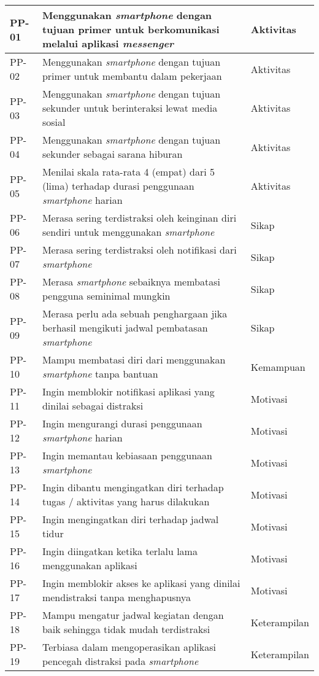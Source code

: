 \begin{footnotesize}
\begin{longtable}[c]{|W{c}{0.07\textwidth}|>{\ccnormspacing}m{0.66\textwidth}|>{\ccnormspacingcenter}m{0.165\textwidth}|}
  PP-01  &  Menggunakan \textit{smartphone} dengan tujuan primer untuk berkomunikasi melalui aplikasi \textit{messenger}  & Aktivitas \\ \hline
  PP-02  &  Menggunakan \textit{smartphone} dengan tujuan primer untuk membantu dalam pekerjaan & Aktivitas \\ \hline
  PP-03  &  Menggunakan \textit{smartphone} dengan tujuan sekunder untuk berinteraksi lewat media sosial & Aktivitas \\ \hline
  PP-04  &  Menggunakan \textit{smartphone} dengan tujuan sekunder sebagai sarana hiburan & Aktivitas \\ \hline
  PP-05  &  Menilai skala rata-rata 4 (empat) dari 5 (lima) terhadap durasi penggunaan \textit{smartphone} harian & Aktivitas \\ \hline
  PP-06  &  Merasa sering terdistraksi oleh keinginan diri sendiri untuk menggunakan \textit{smartphone}  & Sikap \\ \hline
  PP-07  &  Merasa sering terdistraksi oleh notifikasi dari \textit{smartphone} & Sikap \\ \hline
  PP-08  &  Merasa \textit{smartphone} sebaiknya membatasi pengguna seminimal mungkin & Sikap \\ \hline
  PP-09  &  Merasa perlu ada sebuah penghargaan jika berhasil mengikuti jadwal pembatasan \textit{smartphone} & Sikap \\ \hline
  PP-10  &  Mampu membatasi diri dari menggunakan \textit{smartphone} tanpa bantuan & Kemampuan \\ \hline
  PP-11  &  Ingin memblokir notifikasi aplikasi yang dinilai sebagai distraksi & Motivasi \\ \hline
  PP-12  &  Ingin mengurangi durasi penggunaan \textit{smartphone} harian & Motivasi \\ \hline
  PP-13  &  Ingin memantau kebiasaan penggunaan \textit{smartphone} & Motivasi \\ \hline
  PP-14  &  Ingin dibantu mengingatkan diri terhadap tugas / aktivitas yang harus dilakukan & Motivasi \\ \hline
  PP-15  &  Ingin mengingatkan diri terhadap jadwal tidur & Motivasi \\ \hline
  PP-16  &  Ingin diingatkan ketika terlalu lama menggunakan aplikasi & Motivasi \\ \hline
  PP-17  &  Ingin memblokir akses ke aplikasi yang dinilai mendistraksi tanpa menghapusnya & Motivasi \\ \hline
  PP-18  &  Mampu mengatur jadwal kegiatan dengan baik sehingga tidak mudah terdistraksi & Keterampilan \\ \hline
  PP-19  &  Terbiasa dalam mengoperasikan aplikasi pencegah distraksi pada \textit{smartphone}  & Keterampilan \\ \hline
\end{longtable}
\end{footnotesize}
\justifying
\FloatBarrier

